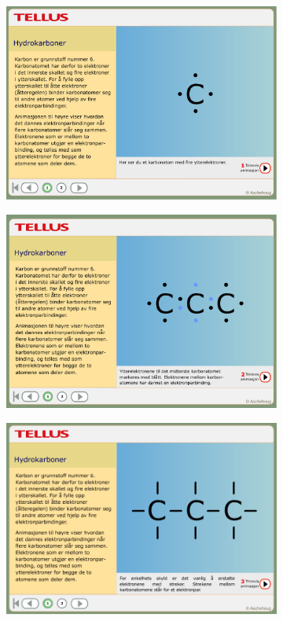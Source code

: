 \documentclass[main.tex]{subfiles}
\begin{document}
\begin{figure}[h!]
\centering
    \begin{subfigure}{.5\textwidth}
    \centering
    \includegraphics[scale = 0.20]{../figures/lokus1.png}
    \end{subfigure}%
    \begin{subfigure}{.5\textwidth}
    \centering
    \includegraphics[scale = 0.199]{../figures/lokus2.png}
    \end{subfigure}
    \begin{subfigure}{.5\textwidth}
    \centering
    \includegraphics[scale = 0.34]{../figures/lokus3.png}

\end{subfigure}
\end{figure}
\end{document}
